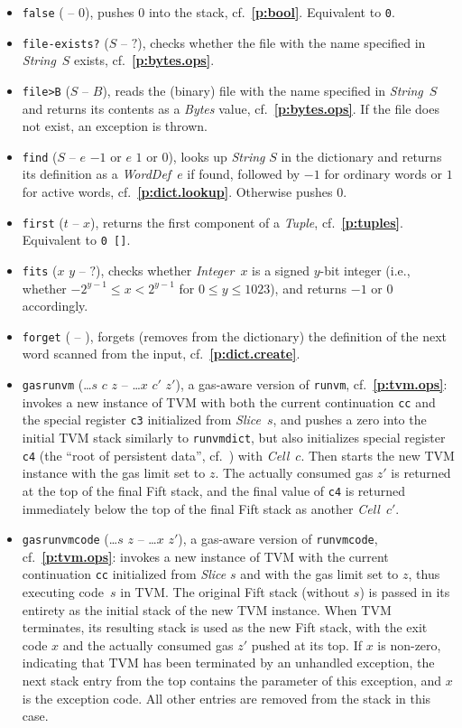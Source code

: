 \documentclass[12pt,oneside]{article}
\def\refpoint#1{{\rm\textbf{\ref{#1}}}}
\let\ptref=\refpoint
\begin{document}
\begin{itemize}
\item {\tt false} ( -- $0$), pushes $0$ into the stack, cf.~\ptref{p:bool}. Equivalent to {\tt 0}.
\item {\tt file-exists?} ($S$ -- $?$), checks whether the file with the name specified in {\em String\/}~$S$ exists, cf.~\ptref{p:bytes.ops}.
\item {\tt file>B} ($S$ -- $B$), reads the (binary) file with the name specified in {\em String\/}~$S$ and returns its contents as a {\em Bytes\/} value, cf.~\ptref{p:bytes.ops}. If the file does not exist, an exception is thrown.
\item {\tt find} ($S$ -- $e$ $-1$ or $e$ $1$ or $0$), looks up {\em String\/} $S$ in the dictionary and returns its definition as a {\em WordDef\/}~$e$ if found, followed by $-1$ for ordinary words or $1$ for active words, cf.~\ptref{p:dict.lookup}. Otherwise pushes $0$.
\item {\tt first} ($t$ -- $x$), returns the first component of a {\em Tuple}, cf.~\ptref{p:tuples}. Equivalent to {\tt 0 []}.
\item {\tt fits} ($x$ $y$ -- $?$), checks whether {\em Integer\/}~$x$ is a signed $y$-bit integer (i.e., whether $-2^{y-1}\leq x<2^{y-1}$ for $0\leq y\leq 1023$), and returns $-1$ or $0$ accordingly.
\item {\tt forget} ( -- ), forgets (removes from the dictionary) the definition of the next word scanned from the input, cf.~\ptref{p:dict.create}.
\item {\tt gasrunvm} (\dots $s$ $c$ $z$ -- \dots $x$ $c'$ $z'$), a gas-aware version of {\tt runvm}, cf.~\ptref{p:tvm.ops}: invokes a new instance of TVM with both the current continuation {\tt cc} and the special register {\tt c3} initialized from {\em Slice\/}~$s$, and pushes a zero into the initial TVM stack similarly to {\tt runvmdict}, but also initializes special register {\tt c4} (the ``root of persistent data'', cf.~\cite[1.4]{TVM}) with {\em Cell\/}~$c$. Then starts the new TVM instance with the gas limit set to $z$. The actually consumed gas $z'$ is returned at the top of the final Fift stack, and the final value of {\tt c4} is returned immediately below the top of the final Fift stack as another {\em Cell\/}~$c'$.
\item {\tt gasrunvmcode} (\dots $s$ $z$ -- \dots $x$ $z'$), a gas-aware version of {\tt runvmcode}, cf.~\ptref{p:tvm.ops}: invokes a new instance of TVM with the current continuation {\tt cc} initialized from {\em Slice\/} $s$ and with the gas limit set to $z$, thus executing code~$s$ in TVM. The original Fift stack (without $s$) is passed in its entirety as the initial stack of the new TVM instance. When TVM terminates, its resulting stack is used as the new Fift stack, with the exit code $x$ and the actually consumed gas $z'$ pushed at its top. If $x$ is non-zero, indicating that TVM has been terminated by an unhandled exception, the next stack entry from the top contains the parameter of this exception, and $x$ is the exception code. All other entries are removed from the stack in this case.

\end{itemize}
\end{document}
